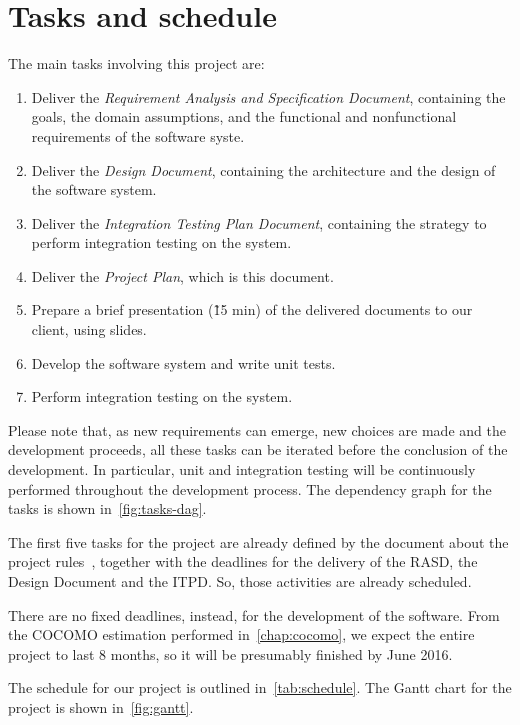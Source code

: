 \chapter{Tasks and schedule}
\label{chap:tasks}

The main tasks involving this project are:
\begin{enumerate}
    \item Deliver the \emph{Requirement Analysis and Specification Document}, containing the goals, the domain assumptions, and the functional and nonfunctional requirements of the software syste.
    \item Deliver the \emph{Design Document}, containing the architecture and the design of the software system.
    \item Deliver the \emph{Integration Testing Plan Document}, containing the strategy to perform integration testing on the system.
    \item Deliver the \emph{Project Plan}, which is this document.
    \item Prepare a brief presentation (\~15 min) of the delivered documents to our client, using slides.
    \item Develop the software system and write unit tests.
    \item Perform integration testing on the system.
\end{enumerate}

Please note that, as new requirements can emerge, new choices are made and the development proceeds, all these tasks can be iterated before the conclusion of the development. In particular, unit and integration testing will be continuously performed throughout the development process. The dependency graph for the tasks is shown in~\autoref{fig:tasks-dag}.

The first five tasks for the project are already defined by the document about the project rules~\cite{se-project-rules}, together with the deadlines for the delivery of the RASD, the Design Document and the ITPD.
So, those activities are already scheduled.

There are no fixed deadlines, instead, for the development of the software. From the COCOMO estimation performed in~\autoref{chap:cocomo}, we expect the entire project to last 8 months, so it will be presumably finished by June 2016.

The schedule for our project is outlined in~\autoref{tab:schedule}. The Gantt chart for the project is shown in~\autoref{fig:gantt}.

